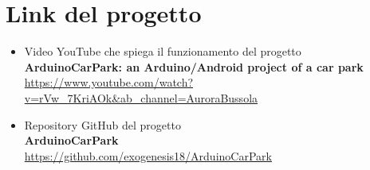 \documentclass[a4paper,titlepage]{report}
\begin{document}
\newpage
\section{Link del progetto}
\begin{itemize}
\item Video YouTube che spiega il funzionamento del progetto\\
\textbf{ArduinoCarPark: an Arduino/Android project of a car park}\\
\url{ https://www.youtube.com/watch?v=rVw_7KriAOk&ab_channel=AuroraBussola}
\item Repository GitHub del progetto\\
\textbf{ArduinoCarPark}\\
\url{ https://github.com/exogenesis18/ArduinoCarPark}
\end{itemize}
\end{document}
